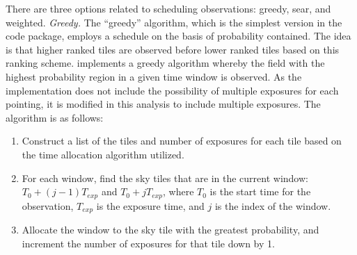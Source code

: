 \documentclass[twocolumn]{aastex62}
\begin{document}
There are three options related to scheduling observations: greedy, sear, and weighted.
\emph{Greedy.} The ``greedy'' algorithm, which is the simplest version in the code package, employs a schedule on the basis of probability contained. The idea is that higher ranked tiles are observed before lower ranked tiles based on this ranking scheme. \cite{RaSi2017} implements a greedy algorithm whereby the field with the highest probability region in a given time window is observed. As the \cite{RaSi2017} implementation does not include the possibility of multiple exposures for each pointing, it is modified in this analysis to include multiple exposures. The algorithm is as follows:

\begin{enumerate}
\item Construct a list of the tiles and number of exposures for each tile based on the time allocation algorithm utilized.
\item For each window, find the sky tiles that are in the current window: $T_0 + (j-1) T_{exp}$ and $T_0 + j T_{exp}$, where $T_0$ is the start time for the observation, $T_{exp}$ is the exposure time, and $j$ is the index of the window.
\item Allocate the window to the sky tile with the greatest probability, and increment the number of exposures for that tile down by 1.
\end{enumerate}
\end{document}

